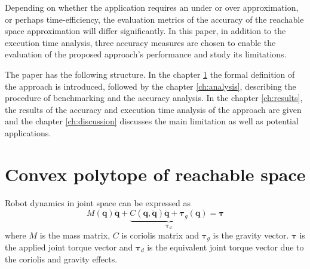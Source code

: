 Depending on whether the application requires an under or over approximation, or perhaps time-efficiency, the evaluation metrics of the accuracy of the reachable space approximation will differ significantly. In this paper, in addition to the execution time analysis, three accuracy measures are chosen to enable the evaluation of the proposed approach's performance and study its limitations.

The paper has the following structure. In the chapter \ref{ch:polytope} the formal definition of the approach is introduced, followed by the chapter \ref{ch:analysis}, describing the procedure of benchmarking and the accuracy analysis. In the chapter \ref{ch:results}, the results of the accuracy and execution time analysis of the approach are given and the chapter \ref{ch:discussion} discusses the main limitation as well as potential applications.




\vspace{-0.1cm}
\section{Convex polytope of reachable space}
\label{ch:polytope}
\vspace{-0.2cm}

Robot dynamics in joint space can be expressed as
\begin{equation}
    M(\bm{q})\ddot{\bm{q}} +\underbrace{ C(\bm{q},\dot{\bm{q}})\dot{\bm{q}} + \bm{\tau}_g(\bm{q}) }_{\bm{\tau}_d}= \bm{\tau}
    \label{eq:robot_model}
\end{equation}
where $M$ is the mass matrix, $C$ is coriolis matrix and $\bm{\tau}_g$ is the gravity vector. $\bm{\tau}$ is the applied joint torque vector and $\bm{\tau}_d$ is the equivalent joint torque vector due to the coriolis and gravity effects.

